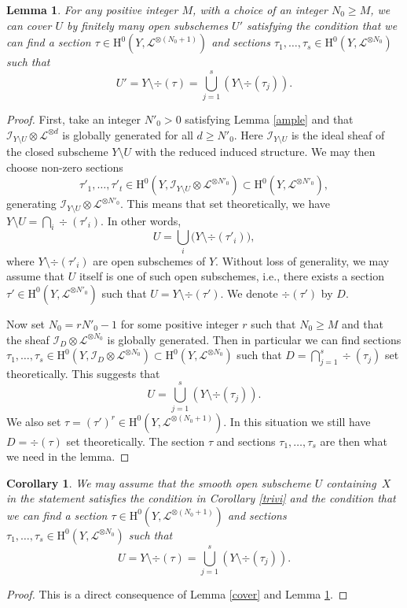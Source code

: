\documentclass[11pt]{article}
\newcommand{\ie}{i.e.,\xspace}
\numberwithin{equation}{section}
\theoremstyle{plain}
\newtheorem{cor}[thm]{Corollary}
\newtheorem{lem}[thm]{Lemma}
\theoremstyle{definition}
\newcommand{\ho}{\mathrm{H}}
\newcommand{\li}{\mathcal{L}}
\begin{document}
\begin{lem}\label{complem}
For any positive integer $M$, with a choice of an integer $N_0\geq M$, we can cover $U$ by finitely many open subschemes $U'$ satisfying the condition that we can find a section $\tau\in \ho^0(Y, \li^{\otimes (N_0+1)})$ and sections $\tau_1,\dots, \tau_s\in \ho^0(Y, \li^{\otimes N_0})$ such that\vspace*{-3pt}
\[
U'=Y\setminus\div (\tau)=\bigcup_{j=1}^s\left(Y\setminus\div (\tau_j)\right).
\]
\end{lem}
\begin{proof}[Proof]
First, take an integer $N'_0>0$ satisfying Lemma \ref{ample} and that $\mathcal{I}_{Y\setminus U}\otimes \li^{\otimes d}$ is globally generated for all $d\geq N'_0$. Here $\mathcal{I}_{Y\setminus U}$ is the ideal sheaf of the closed subscheme $Y\setminus U$ with the reduced induced structure. We may then choose non-zero sections\vspace*{-3pt}
\[
\tau'_1,\dots, \tau'_t\in \ho^0(Y, \mathcal{I}_{Y\setminus U}\otimes \li^{\otimes N'_0})\subset \ho^0(Y, \li^{\otimes N'_0}),
\]
generating $\mathcal{I}_{Y\setminus U}\otimes \li^{\otimes N'_0}$. This means that set theoretically, we have $Y\setminus U=\bigcap_{i}\div (\tau'_i)$. In other words,\vspace*{-3pt}
\[
U=\bigcup_{i}\big(Y\setminus\div (\tau'_i) \big),
\]
where $Y\setminus\div (\tau'_i)$ are open subschemes of $Y$. Without loss of generality, we may assume that $U$ itself is one of such open subschemes, \ie there exists a section $\tau'\in \ho^0(Y, \li^{\otimes N'_0})$ such that $U=Y\setminus\div (\tau')$. We denote $\div (\tau')$ by $D$.

Now set $N_0=r N'_0-1$ for some positive integer $r$ such that $N_0\geq M$ and that the sheaf $\mathcal{I}_D\otimes \li^{\otimes N_0}$ is globally generated. Then in particular we can find sections $\tau_1,\dots, \tau_s\in \ho^0(Y, \mathcal{I}_D\otimes \li^{\otimes N_0})\subset \ho^0(Y, \li^{\otimes N_0})$ such that $D=\bigcap_{j=1}^s\div (\tau_j)$ set theoretically. This suggests that\vspace*{-3pt}
\[
U=\bigcup_{j=1}^s\left(Y\setminus\div (\tau_j)\right).
\]
We also set $\tau=(\tau')^r\in \ho^0(Y, \li^{\otimes (N_0+1)})$. In this situation we still have $D=\div (\tau)$ set theoretically. The section $\tau$ and sections $\tau_1,\dots, \tau_s$ are then what we need in the lemma.
\end{proof}

\begin{cor}
We may assume that the smooth open subscheme $U$ containing~$X$ in the statement satisfies the condition in Corollary \ref{trivi} and the condition that we can find a section $\tau\in \ho^0(Y, \li^{\otimes (N_0+1)})$ and sections $\tau_1,\dots, \tau_s\in \ho^0(Y, \li^{\otimes N_0})$ such that\vspace*{-3pt}
\[
U=Y\setminus\div (\tau)=\bigcup_{j=1}^s\left(Y\setminus\div (\tau_j)\right).
\]
\end{cor}
\begin{proof}[Proof]
This is a direct consequence of Lemma \ref{cover} and Lemma \ref{complem}.
\end{proof}
\end{document}
